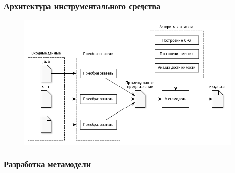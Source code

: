 \documentclass{beamer}
\begin{document}
\begin{frame}
\frametitle{Архитектура инструментального средства}

\begin{figure}[h!]
    \begin{center}
        \includegraphics[width=\textwidth]{img/architecture.png}
    \end{center}
\end{figure}
\end{frame}
\begin{frame}[t]
\frametitle{Разработка метамодели}


\end{frame}
\end{document}
